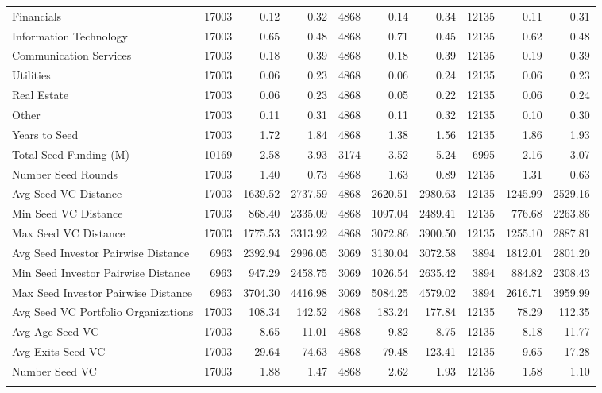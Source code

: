 {\begin{table}[!h]
{\begin{tabular}[t]{lrrrrrrrrr}
Financials & 17003 & 0.12 & 0.32 & 4868 & 0.14 & 0.34 & 12135 & 0.11 & 0.31\\
Information Technology & 17003 & 0.65 & 0.48 & 4868 & 0.71 & 0.45 & 12135 & 0.62 & 0.48\\
Communication Services & 17003 & 0.18 & 0.39 & 4868 & 0.18 & 0.39 & 12135 & 0.19 & 0.39\\
Utilities & 17003 & 0.06 & 0.23 & 4868 & 0.06 & 0.24 & 12135 & 0.06 & 0.23\\
\addlinespace
Real Estate & 17003 & 0.06 & 0.23 & 4868 & 0.05 & 0.22 & 12135 & 0.06 & 0.24\\
Other & 17003 & 0.11 & 0.31 & 4868 & 0.11 & 0.32 & 12135 & 0.10 & 0.30\\
Years to Seed & 17003 & 1.72 & 1.84 & 4868 & 1.38 & 1.56 & 12135 & 1.86 & 1.93\\
Total Seed Funding (M) & 10169 & 2.58 & 3.93 & 3174 & 3.52 & 5.24 & 6995 & 2.16 & 3.07\\
Number Seed Rounds & 17003 & 1.40 & 0.73 & 4868 & 1.63 & 0.89 & 12135 & 1.31 & 0.63\\
\addlinespace
Avg Seed VC Distance & 17003 & 1639.52 & 2737.59 & 4868 & 2620.51 & 2980.63 & 12135 & 1245.99 & 2529.16\\
Min Seed VC Distance & 17003 & 868.40 & 2335.09 & 4868 & 1097.04 & 2489.41 & 12135 & 776.68 & 2263.86\\
Max Seed VC Distance & 17003 & 1775.53 & 3313.92 & 4868 & 3072.86 & 3900.50 & 12135 & 1255.10 & 2887.81\\
Avg Seed Investor Pairwise Distance & 6963 & 2392.94 & 2996.05 & 3069 & 3130.04 & 3072.58 & 3894 & 1812.01 & 2801.20\\
Min Seed Investor Pairwise Distance & 6963 & 947.29 & 2458.75 & 3069 & 1026.54 & 2635.42 & 3894 & 884.82 & 2308.43\\
\addlinespace
Max Seed Investor Pairwise Distance & 6963 & 3704.30 & 4416.98 & 3069 & 5084.25 & 4579.02 & 3894 & 2616.71 & 3959.99\\
Avg Seed VC Portfolio Organizations & 17003 & 108.34 & 142.52 & 4868 & 183.24 & 177.84 & 12135 & 78.29 & 112.35\\
Avg Age Seed VC & 17003 & 8.65 & 11.01 & 4868 & 9.82 & 8.75 & 12135 & 8.18 & 11.77\\
Avg Exits Seed VC & 17003 & 29.64 & 74.63 & 4868 & 79.48 & 123.41 & 12135 & 9.65 & 17.28\\
Number Seed VC & 17003 & 1.88 & 1.47 & 4868 & 2.62 & 1.93 & 12135 & 1.58 & 1.10\\
\addlinespace

\end{tabular}}
\end{table}}
